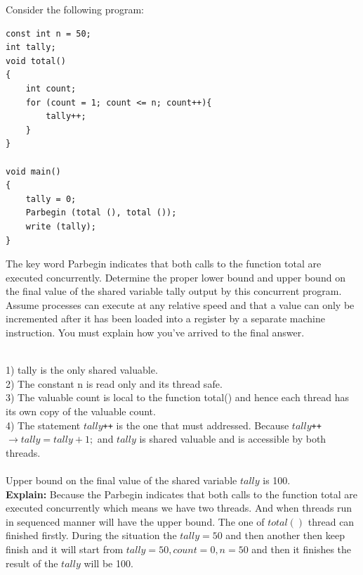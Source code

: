 \documentclass[12pt]{article}
\newenvironment{sol}[1][Solution]{\begin{trivlist}\item[\hskip\labelsep {\bfseries #1:}]}{\end{trivlist}}
\begin{document}
\begin{enumerate}
    \item Consider the following program:
 \begin{verbatim}
const int n = 50;
int tally;
void total()
{
    int count;
    for (count = 1; count <= n; count++){
        tally++;
    }
}

void main()
{
    tally = 0;
    Parbegin (total (), total ());
    write (tally);
}
\end{verbatim}
The key word Parbegin indicates that both calls to the function total are executed concurrently. Determine the proper lower bound and upper bound on the final value of the shared variable tally output by this concurrent program. Assume processes can execute at any relative speed and that a value can only be incremented after it has been loaded into a register by a separate machine instruction. You must explain how you’ve arrived to the final answer.
\begin{sol}
\hspace*{\fill}\\
1) tally is the only shared valuable.\\
2) The constant n is read only and its thread safe.\\
3) The valuable count is local to the function total() and hence each thread has its own copy of the valuable count.\\
4) The statement $tally$\texttt{++} is the one that must addressed. Because $tally$\texttt{++} $ \rightarrow tally = tally +1;$ and $tally$ is shared valuable and is accessible by both threads.\\
\\
Upper bound on the final value of the shared variable $tally$ is 100.\\
\textbf{Explain:} Because the Parbegin indicates that both calls to the function total are executed concurrently which means we have two threads. And when threads run in sequenced manner will have the upper bound. The one of $total()$ thread can finished firstly. During the situation the $tally = 50$ and then another then keep finish and it will start from $tally = 50, count = 0, n = 50 $  and then it finishes the result of the $tally$ will be 100.   


\end{sol}
\end{enumerate}
\end{document}
